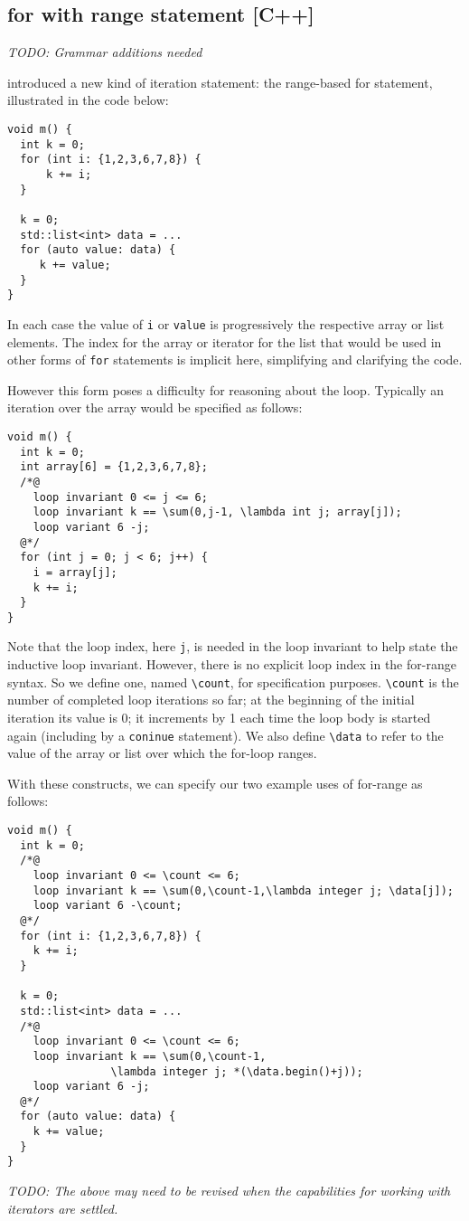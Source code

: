 \subsection{for with range statement [C++]}

\emph{TODO: Grammar additions needed}

\lang{} introduced a new kind of iteration statement: the range-based for statement, illustrated in the code below:
\begin{lstlisting}
void m() {
  int k = 0;
  for (int i: {1,2,3,6,7,8}) {
      k += i;
  }
  
  k = 0;
  std::list<int> data = ...
  for (auto value: data) {
     k += value;
  }
}
\end{lstlisting}

In each case the value of \lstinline|i| or \lstinline|value| is progressively the respective array or list elements. The  
index for the array or iterator for the list that would be used in other forms of \lstinline|for| statements is implicit here, simplifying and
clarifying the code.

However this form poses a difficulty for reasoning about the loop. Typically an iteration over the array would be specified as follows:
\begin{lstlisting}
void m() {
  int k = 0;
  int array[6] = {1,2,3,6,7,8};
  /*@
    loop invariant 0 <= j <= 6;
    loop invariant k == \sum(0,j-1, \lambda int j; array[j]);
    loop variant 6 -j;
  @*/
  for (int j = 0; j < 6; j++) {
    i = array[j];
    k += i;
  }
}
\end{lstlisting}

Note that the loop index, here \lstinline|j|, is needed in the loop invariant to help state the inductive loop invariant. However, there is no explicit loop index in the
for-range syntax. So we define one, named \lstinline|\count|, for specification purposes.
\lstinline|\count| is the number of completed loop iterations so far; 
at the beginning of the initial iteration its value is 0; it 
increments by 1 each time the loop body is started again (including by a
\lstinline|coninue| statement).
We also define \lstinline|\data| to refer to the value of the array or list over which the for-loop ranges.

With these constructs, we can specify our two example uses of for-range as follows:
\begin{lstlisting}
void m() {
  int k = 0;
  /*@
    loop invariant 0 <= \count <= 6;
    loop invariant k == \sum(0,\count-1,\lambda integer j; \data[j]);
    loop variant 6 -\count;
  @*/
  for (int i: {1,2,3,6,7,8}) {
    k += i;
  }

  k = 0;
  std::list<int> data = ...
  /*@
    loop invariant 0 <= \count <= 6;
    loop invariant k == \sum(0,\count-1,
                \lambda integer j; *(\data.begin()+j));
    loop variant 6 -j;
  @*/
  for (auto value: data) {
    k += value;
  }
}
\end{lstlisting}

\emph{TODO: The above may need to be revised when the capabilities for working with iterators are settled.}


